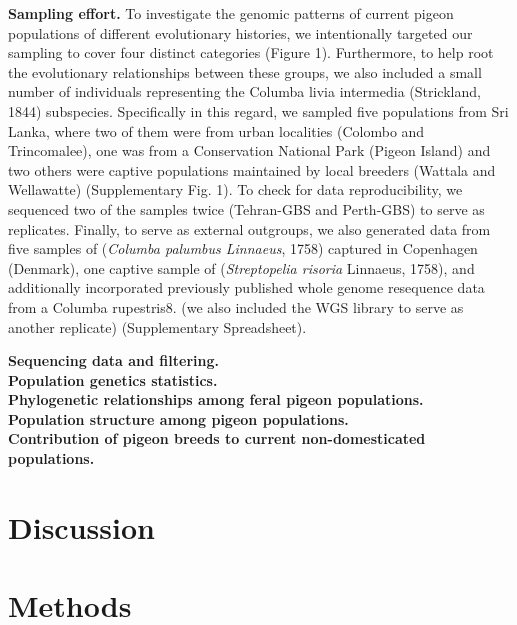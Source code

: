 \documentclass[twoside, british, a4paper]{article}
\begin{document}
\begin{multicols}{2}
\noindent \textbf{Sampling effort.} To investigate the genomic patterns of current pigeon populations of different evolutionary histories, we intentionally targeted our sampling to cover four distinct categories (Figure 1). Furthermore, to help root the evolutionary relationships between these groups, we also included a small number of individuals representing the Columba livia intermedia (Strickland, 1844) subspecies. Specifically in this regard, we sampled five populations from Sri Lanka, where two of them were from urban localities (Colombo and Trincomalee), one was from a Conservation National Park (Pigeon Island) and two others were captive populations maintained by local breeders (Wattala and Wellawatte) (Supplementary Fig. 1). To check for data reproducibility, we sequenced two of the samples twice (Tehran-GBS and Perth-GBS) to serve as replicates. Finally, to serve as external outgroups, we also generated data from five samples of (\textit{Columba palumbus Linnaeus}, 1758) captured in Copenhagen (Denmark), one captive sample of (\textit{Streptopelia risoria} Linnaeus, 1758), and additionally incorporated previously published whole genome resequence data from a Columba rupestris8. (we also included the WGS library to serve as another replicate) (Supplementary Spreadsheet).

\noindent \textbf{Sequencing data and filtering.}\\
\noindent \textbf{Population genetics statistics.}\\
\noindent \textbf{Phylogenetic relationships among feral pigeon populations.}\\
\noindent \textbf{Population structure among pigeon populations.}\\
\noindent \textbf{Contribution of pigeon breeds to current non-domesticated populations.}\\
\end{multicols}



\section*{Discussion}


\section*{Methods}
\end{document}
